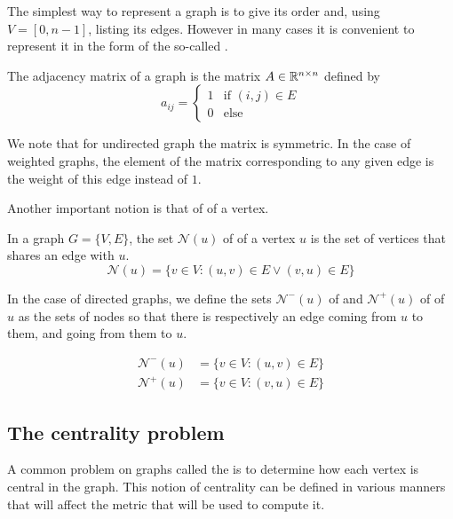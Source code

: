 The simplest way to represent a graph is to give its order and, using $V = [0, n-1]$, listing its edges. However in many cases it is convenient to represent it in the form of the so-called .

\begin{definition}
    The adjacency matrix of a graph is the matrix $A \in \mathbb{R}^{n\times n}$ defined by
    $$
    a_{ij} = \begin{cases}
        1 & \text{if $(i, j) \in E$}\\
        0 & \text{else}
    \end{cases}$$
\end{definition}

We note that for undirected graph the matrix is symmetric. In the case of weighted graphs, the element of the matrix corresponding to any given edge is the weight of this edge instead of $1$.

Another important notion is that of  of a vertex.
\begin{definition}[Neighbors]
    In a graph $G = \{V, E\}$, the set $\mathcal{N}(u)$ of  of a vertex $u$ is the set of vertices that shares an edge with $u$.
    \begin{equation}
        \mathcal{N}(u) = \{v\in V : (u, v) \in E \vee (v, u) \in E\}
    \end{equation}

    In the case of directed graphs, we define the sets $\mathcal{N}^-(u)$ of  and $\mathcal{N}^+(u)$ of  of $u$ as the sets of nodes so that there is respectively an edge coming from $u$ to them, and going from them to $u$.

    \begin{equation}
        \begin{array}{ll}
            \mathcal{N}^-(u) & = \{v\in V : (u, v) \in E\} \\
            \mathcal{N}^+(u) & = \{v\in V : (v, u) \in E\}
        \end{array}
    \end{equation}
\end{definition}

\subsection{The centrality problem}\label{subsec:Intro_centrality}
A common problem on graphs called the  is to determine how each vertex is central in the graph. This notion of centrality can be defined in various manners that will affect the metric that will be used to compute it.

